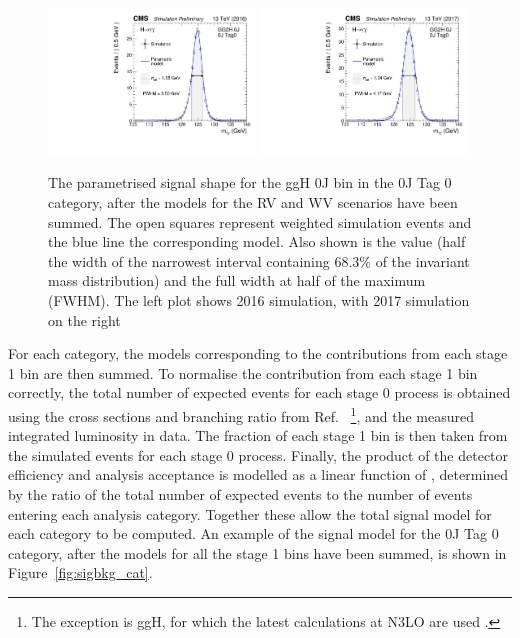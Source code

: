 \begin{figure}[hptb]
  \centering
  \includegraphics[width=0.49\textwidth]{Figures/SigBkg/GG2H_0J_RECO_0J_Tag0_2016.pdf}
  \includegraphics[width=0.49\textwidth]{Figures/SigBkg/GG2H_0J_RECO_0J_Tag0_2017.pdf}
  \caption[Signal model for the ggH 0J bin in the 0J Tag 0 category.]
  {
    The parametrised signal shape for the ggH 0J bin in the 0J Tag 0 category, 
    after the models for the RV and WV scenarios have been summed.
    The open squares represent weighted simulation events and the blue line the
    corresponding model. Also shown is the \seff value (half the width of the narrowest interval
    containing 68.3\% of the invariant mass distribution) and the full width at half of the maximum
    (FWHM). The left plot shows 2016 simulation, with 2017 simulation on the right
  }
  \label{fig:sigbkg_proccat}
\end{figure}

For each category, 
the models corresponding to the contributions from each stage 1 bin are then summed.
To normalise the contribution from each stage 1 bin correctly, 
the total number of expected events for each stage 0 process is obtained 
using the cross sections and \Hgg branching ratio from Ref.~\cite{YR4} 
\footnote{The exception is ggH, 
for which the latest calculations at N3LO are used \cite{Anastasiou2015,Anastasiou2016}.},
and the measured integrated luminosity in data.
The fraction of each stage 1 bin is then taken from the simulated events for each stage 0 process.
Finally, the product of the detector efficiency and analysis acceptance 
is modelled as a linear function of \mH, 
determined by the ratio of the total number of expected events 
to the number of events entering each analysis category.
Together these allow the total signal model for each category to be computed.
An example of the signal model for the 0J Tag 0 category, 
after the models for all the stage 1 bins have been summed, 
is shown in Figure~\ref{fig:sigbkg_cat}.

